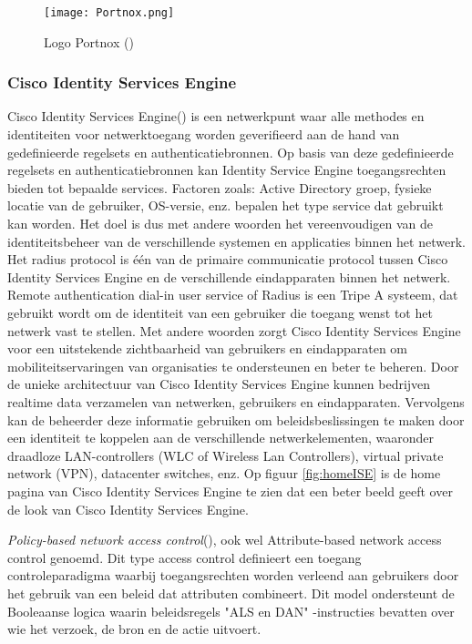 \begin{figure}[H]
	\centering
	\texttt{[image: Portnox.png]}
	\caption{Logo Portnox (\cite{PortnoxLogo})}
	\label{fig:Portnox}
\end{figure}

\subsubsection{\bf Cisco Identity Services Engine}
Cisco Identity Services Engine(\cite{ISE}) is een netwerkpunt waar alle methodes en identiteiten voor netwerktoegang worden geverifieerd aan de hand van gedefinieerde regelsets en authenticatiebronnen. Op basis van deze gedefinieerde regelsets en authenticatiebronnen kan Identity Service Engine toegangsrechten bieden tot bepaalde services. Factoren zoals: Active Directory groep, fysieke locatie van de gebruiker, OS-versie, enz. bepalen het type service dat gebruikt kan worden. Het doel is dus met andere woorden het vereenvoudigen van de identiteitsbeheer van de verschillende systemen en applicaties binnen het netwerk.
\newline
\newline   
Het radius protocol is één van de primaire communicatie protocol tussen Cisco Identity Services Engine en de verschillende eindapparaten binnen het netwerk.
\newline
\newline 
Remote authentication dial-in user service of Radius is een Tripe A systeem, dat gebruikt wordt om de identiteit van een gebruiker die toegang wenst tot het netwerk vast te stellen. Met andere woorden zorgt Cisco Identity Services Engine voor een uitstekende zichtbaarheid van gebruikers en eindapparaten om mobiliteitservaringen van organisaties te ondersteunen en beter te beheren.
\newline
\newline
Door de unieke architectuur van Cisco Identity Services Engine kunnen bedrijven realtime data verzamelen van netwerken, gebruikers en eindapparaten. Vervolgens kan de beheerder deze informatie gebruiken om beleidsbeslissingen te maken door een identiteit te koppelen aan de verschillende netwerkelementen, waaronder draadloze LAN-controllers (WLC of Wireless Lan Controllers), virtual private network (VPN), datacenter switches, enz. Op figuur \ref{fig:homeISE} is de home pagina van Cisco Identity Services Engine te zien dat een beter beeld geeft over de look van Cisco Identity Services Engine.

\newpage
{}
\newline
\textit{Policy-based network access control}(\cite{ABAC}), ook wel Attribute-based network access control genoemd. Dit type access control definieert een toegang controleparadigma waarbij toegangsrechten worden verleend aan gebruikers door het gebruik van een beleid dat attributen combineert. Dit model ondersteunt de Booleaanse logica waarin beleidsregels "ALS en DAN" -instructies bevatten over wie het verzoek, de bron en de actie uitvoert.

